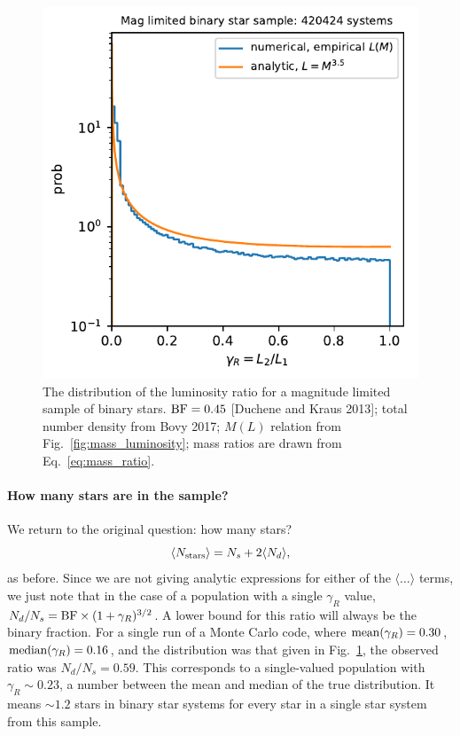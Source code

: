 \documentclass{emulateapj}
\begin{document}
\begin{figure}[!t]
	\begin{center}
		\includegraphics[scale=.8]{figures/gammaR_distribn_mag_limited.pdf}
	\end{center}
	\caption{The distribution of the luminosity ratio for a magnitude limited 
		sample of binary stars. ${\rm BF} = 0.45$ [Duchene and Kraus 2013]; 
		total 
		number density from Bovy 2017; $M(L)$ relation from 
		Fig.~\ref{fig:mass_luminosity}; mass ratios are drawn from 
		Eq.~\ref{eq:mass_ratio}.}
	\label{fig:gammaR_distribn_mag_limited}
\end{figure}

\paragraph{How many stars are in the sample?}

We return to the original question: how many stars?
\begin{equation}
\langle N_{\rm stars} \rangle = N_s + 2 \langle N_d \rangle,
\end{equation}
as before.
Since we are not giving analytic expressions for either of the $\langle \ldots 
\rangle$ terms, we just note that in the case of a population with a single 
$\gamma_R$ value, $N_d/N_s = {\rm BF} \times (1 + \gamma_R)^{3/2}$. A lower
bound for this ratio will always be the binary fraction.
For a single run of a Monte Carlo code, where ${\rm mean}(\gamma_R) = 0.30$, 
${\rm median}(\gamma_R) = 0.16$, and the distribution was that given in 
Fig.~\ref{fig:gammaR_distribn_mag_limited}, the observed ratio was $N_d/N_s = 
0.59$.
This corresponds to a single-valued population with $\gamma_R \sim 0.23$, a
number between the mean and median of the true distribution.
It means $\sim 1.2$ stars in binary star systems for every star in a single 
star system from this sample.
\end{document}
